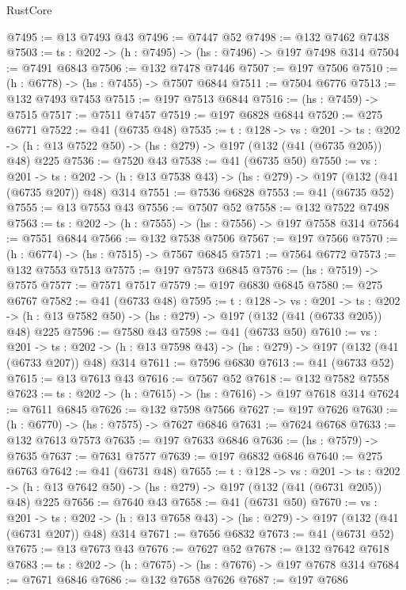 \begin{lexlean}{RustCore}
\begin{coremodule}
@7495 := @13 @7493 @43
@7496 := @7447 @52
@7498 := @132 @7462 @7438
@7503 := {ts : @202} -> (h : @7495) -> (hs : @7496) -> @197 @7498 @314
@7504 := @7491 @6843
@7506 := @132 @7478 @7446
@7507 := @197 @7506
@7510 := (h : @6778) -> (hs : @7455) -> @7507 @6844
@7511 := @7504 @6776
@7513 := @132 @7493 @7453
@7515 := @197 @7513 @6844
@7516 := (hs : @7459) -> @7515
@7517 := @7511 @7457
@7519 := @197 @6828 @6844
@7520 := @275 @6771
@7522 := @41 (@6735 @48)
@7535 := {t : @128} ->
  {vs : @201} ->
  {ts : @202} -> (h : @13 @7522 @50) -> (hs : @279) -> @197 (@132 (@41 (@6735 @205)) @48) @225
@7536 := @7520 @43
@7538 := @41 (@6735 @50)
@7550 := {vs : @201} ->
  {ts : @202} -> (h : @13 @7538 @43) -> (hs : @279) -> @197 (@132 (@41 (@6735 @207)) @48) @314
@7551 := @7536 @6828
@7553 := @41 (@6735 @52)
@7555 := @13 @7553 @43
@7556 := @7507 @52
@7558 := @132 @7522 @7498
@7563 := {ts : @202} -> (h : @7555) -> (hs : @7556) -> @197 @7558 @314
@7564 := @7551 @6844
@7566 := @132 @7538 @7506
@7567 := @197 @7566
@7570 := (h : @6774) -> (hs : @7515) -> @7567 @6845
@7571 := @7564 @6772
@7573 := @132 @7553 @7513
@7575 := @197 @7573 @6845
@7576 := (hs : @7519) -> @7575
@7577 := @7571 @7517
@7579 := @197 @6830 @6845
@7580 := @275 @6767
@7582 := @41 (@6733 @48)
@7595 := {t : @128} ->
  {vs : @201} ->
  {ts : @202} -> (h : @13 @7582 @50) -> (hs : @279) -> @197 (@132 (@41 (@6733 @205)) @48) @225
@7596 := @7580 @43
@7598 := @41 (@6733 @50)
@7610 := {vs : @201} ->
  {ts : @202} -> (h : @13 @7598 @43) -> (hs : @279) -> @197 (@132 (@41 (@6733 @207)) @48) @314
@7611 := @7596 @6830
@7613 := @41 (@6733 @52)
@7615 := @13 @7613 @43
@7616 := @7567 @52
@7618 := @132 @7582 @7558
@7623 := {ts : @202} -> (h : @7615) -> (hs : @7616) -> @197 @7618 @314
@7624 := @7611 @6845
@7626 := @132 @7598 @7566
@7627 := @197 @7626
@7630 := (h : @6770) -> (hs : @7575) -> @7627 @6846
@7631 := @7624 @6768
@7633 := @132 @7613 @7573
@7635 := @197 @7633 @6846
@7636 := (hs : @7579) -> @7635
@7637 := @7631 @7577
@7639 := @197 @6832 @6846
@7640 := @275 @6763
@7642 := @41 (@6731 @48)
@7655 := {t : @128} ->
  {vs : @201} ->
  {ts : @202} -> (h : @13 @7642 @50) -> (hs : @279) -> @197 (@132 (@41 (@6731 @205)) @48) @225
@7656 := @7640 @43
@7658 := @41 (@6731 @50)
@7670 := {vs : @201} ->
  {ts : @202} -> (h : @13 @7658 @43) -> (hs : @279) -> @197 (@132 (@41 (@6731 @207)) @48) @314
@7671 := @7656 @6832
@7673 := @41 (@6731 @52)
@7675 := @13 @7673 @43
@7676 := @7627 @52
@7678 := @132 @7642 @7618
@7683 := {ts : @202} -> (h : @7675) -> (hs : @7676) -> @197 @7678 @314
@7684 := @7671 @6846
@7686 := @132 @7658 @7626
@7687 := @197 @7686

\end{coremodule}
\end{lexlean}

